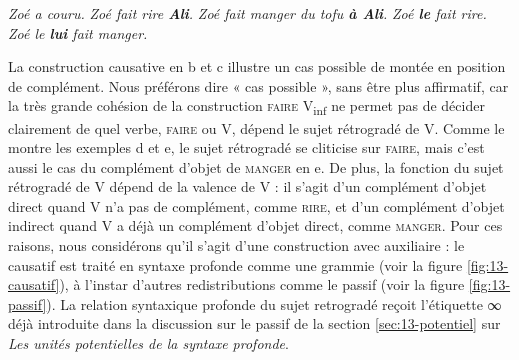 \ea\label{ex:13-aux}
\ea \textit{Zoé a couru.}
\ex \textit{Zoé fait rire \textbf{Ali}.}
\ex \textit{Zoé fait manger du tofu \textbf{à Ali}.}
\ex \textit{Zoé \textbf{le} fait rire.}
\ex \textit{Zoé le \textbf{lui} fait manger.}\z\z

La construction causative en b et c illustre un cas possible de montée en position de complément. Nous préférons dire « cas possible », sans être plus affirmatif, car la très grande cohésion de la construction \textsc{faire} V\textsubscript{inf} ne permet pas de décider clairement de quel verbe, \textsc{faire} ou V, dépend le sujet rétrogradé de V. Comme le montre les exemples d et e, le sujet rétrogradé se cliticise sur \textsc{faire}, mais c’est aussi le cas du complément d’objet de \textsc{manger} en e. De plus, la fonction du sujet rétrogradé de V dépend de la valence de V : il s’agit d’un complément d’objet direct quand V n’a pas de complément, comme \textsc{rire}, et d’un complément d’objet indirect quand V a déjà un complément d’objet direct, comme \textsc{manger}. Pour ces raisons, nous considérons qu’il s’agit d’une construction avec auxiliaire : le causatif est traité en syntaxe profonde comme une grammie (voir la figure \ref{fig:13-causatif}), à l’instar d’autres redistributions comme le passif (voir la figure \ref{fig:13-passif}). La relation syntaxique profonde du sujet retrogradé reçoit l’étiquette ∞ déjà introduite dans la discussion sur le passif de la section \ref{sec:13-potentiel} sur \textit{Les unités potentielles de la syntaxe profonde}.

